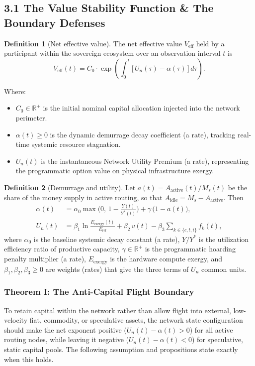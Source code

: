 \documentclass[11pt,a4paper]{article}
\theoremstyle{definition}
\newtheorem{definition}{Definition}
\theoremstyle{plain}
\theoremstyle{remark}
\newcommand{\R}{\mathbb{R}}
\begin{document}
\subsection*{3.1 The Value Stability Function \& The Boundary Defenses}
\begin{definition}[Net effective value]\label{def:Veff}
The net effective value $V_{\mathrm{eff}}$ held by a participant within the sovereign ecosystem over an observation interval $t$ is
\begin{equation}
V_{\mathrm{eff}}(t) = C_0 \cdot \exp\!\left( \int_0^t \bigl[\, U_n(\tau) - \alpha(\tau) \,\bigr]\, d\tau \right).
\end{equation}
\end{definition}

Where:
\begin{itemize}
\item $C_0 \in \R^{+}$ is the initial nominal capital allocation injected into the network perimeter.
\item $\alpha(t) \ge 0$ is the dynamic demurrage decay coefficient (a rate), tracking real-time systemic resource stagnation.
\item $U_n(t)$ is the instantaneous Network Utility Premium (a rate), representing the programmatic option value on physical infrastructure exergy.
\end{itemize}

\begin{definition}[Demurrage and utility]\label{def:alphaU}
Let $a(t) = A_{\mathrm{active}}(t)/M_s(t)$ be the share of the money supply in active routing, so that $A_{\mathrm{idle}} = M_s - A_{\mathrm{active}}$. Then
\begin{align}
\alpha(t) &= \alpha_0 \max\!\Big(0,\, 1 - \frac{Y(t)}{Y^{*}(t)}\Big) + \gamma\,\big(1 - a(t)\big), \\
U_n(t) &= \beta_1 \ln\!\frac{E_{\mathrm{exergy}}(t)}{E_{\mathrm{ref}}}
+ \beta_2\, v(t) - \beta_3 \sum_{k \in \{c,t,i\}} f_k(t),
\end{align}
where $\alpha_0$ is the baseline systemic decay constant (a rate), $Y/Y^{*}$ is the utilization efficiency ratio of productive capacity, $\gamma \in \R^{+}$ is the programmatic hoarding penalty multiplier (a rate), $E_{\mathrm{exergy}}$ is the hardware compute exergy, and $\beta_1, \beta_2, \beta_3 \ge 0$ are weights (rates) that give the three terms of $U_n$ common units.
\end{definition}

\subsubsection*{Theorem I: The Anti-Capital Flight Boundary}
To retain capital within the network rather than allow flight into external, low-velocity fiat, commodity, or speculative assets, the network state configuration should make the net exponent positive ($U_n(t) - \alpha(t) > 0$) for all active routing nodes, while leaving it negative ($U_n(t) - \alpha(t) < 0$) for speculative, static capital pools. The following assumption and propositions state exactly when this holds.
\end{document}
